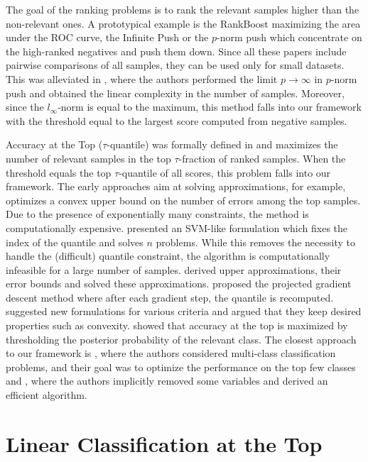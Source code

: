 \documentclass{Thesis}
\begin{document}
The goal of the ranking problems is to rank the relevant samples higher than the non-relevant ones. A prototypical example is the RankBoost \cite{freund2003efficient} maximizing the area under the ROC curve, the Infinite Push \cite{agarwal2011infinite} or the $p$-norm push \cite{rudin.2009} which concentrate on the high-ranked negatives and push them down. Since all these papers include pairwise comparisons of all samples, they can be used only for small datasets. This was alleviated in \cite{Li_TopPush}, where the authors performed the limit $p \to \infty$ in $p$-norm push and obtained the linear complexity in the number of samples. Moreover, since the $l_{\infty}$-norm is equal to the maximum, this method falls into our framework with the threshold equal to the largest score computed from negative samples.

Accuracy at the Top ($\tau$-quantile) was formally defined in \cite{boyd2012accuracy} and maximizes the number of relevant samples in the top $\tau$-fraction of ranked samples. When the threshold equals the top $\tau$-quantile of all scores, this problem falls into our framework. The early approaches aim at solving approximations, for example, \cite{Joachims:2005:SVM:1102351.1102399} optimizes a convex upper bound on the number of errors among the top samples. Due to the presence of exponentially many constraints, the method is computationally expensive. \cite{boyd2012accuracy} presented an SVM-like formulation which fixes the index of the quantile and solves $n$ problems. While this removes the necessity to handle the (difficult) quantile constraint, the algorithm is computationally infeasible for a large number of samples. \cite{kar2015surrogate} derived upper approximations, their error bounds and solved these approximations. \cite{Grill_2016} proposed the projected gradient descent method where after each gradient step, the quantile is recomputed. \cite{Eban_2017} suggested new formulations for various criteria and argued that they keep desired properties such as convexity. \cite{tasche2018plug} showed that accuracy at the top is maximized by thresholding the posterior probability of the relevant class. The closest approach to our framework is \cite{lapin.2015,lapin2018analysis}, where the authors considered multi-class classification problems, and their goal was to optimize the performance on the top few classes and \cite{mackey2018constrained}, where the authors implicitly removed some variables and derived an efficient algorithm.


\chapter{Linear Classification at the Top}
\end{document}
